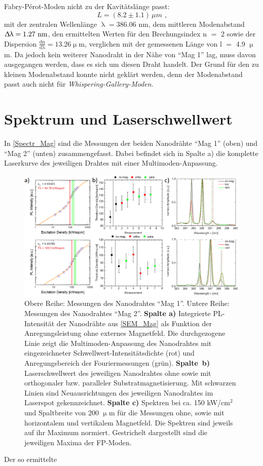 Fabry-Pérot-Moden nicht zu der Kavitätslänge passt: \begin{equation} L=(8.2 \pm
1.1)\, \mu m \text{ ,} \end{equation} mit der zentralen Wellenlänge $\uplambda =
\text{386.06 nm}$, dem mittleren Modenabstand $\Updelta \uplambda = \text{1.27
nm}$, den ermittelten Werten für den Brechungsindex n $=$ 2 sowie der Dispersion
$\frac{\text{dn}}{\text{d}\uplambda} = \text{13.26} \upmu\text{m}$, verglichen
mit der gemessenen Länge von l $=$ 4.9 $\upmu$m. Da jedoch kein weiterer
Nanodraht in der Nähe von ``Mag 1'' lag, muss davon ausgegangen werden, dass es
sich um diesen Draht handelt. Der Grund für den zu kleinen Modenabstand konnte
nicht geklärt werden, denn der Modenabstand passt auch nicht für
\textit{Whispering-Gallery-Moden}. \section{Spektrum und Laserschwellwert} In
\autoref{Spectr_Mag} sind die Messungen der beiden Nanodrähte ``Mag 1'' (oben)
und ``Mag 2'' (unten) zusammengefasst. Dabei befindet sich in Spalte a) die
komplette Laserkurve des jeweiligen Drahtes mit einer
Multimoden-Anpassung.\begin{figure}[b] \centering
\includegraphics[width=1\textwidth]{Bilder/Mag/Spectr_Mag} \caption{Obere Reihe:
Messungen des Nanodrahtes ``Mag 1''. Untere Reihe: Messungen des Nanodrahtes
``Mag 2''. \textbf{Spalte a)} Integrierte PL-Intensität der Nanodrähte aus
\autoref{SEM_Mag} als Funktion der Anregungsleistung ohne externes Magnetfeld.
Die durchgezogene Linie zeigt die Multimoden-Anpassung des Nanodrahtes mit
eingezeichneter Schwellwert-Intensitätsdichte (rot) und Anregungsbereich der
Fouriermessungen (grün). \mbox{\textbf{Spalte b)}} Laserschwellwert des
jeweiligen Nanodrahtes ohne sowie mit orthogonaler bzw. paralleler
Substratmagnetisierung. Mit schwarzen Linien sind Neuausrichtungen des
jeweiligen Nanodrahtes im Laserspot gekennzeichnet. \textbf{Spalte c)} Spektren
bei ca. 150 kW/cm$^\text{2}$ und Spaltbreite von 200 $\upmu$m für die Messungen
ohne, sowie mit horizontalem und vertikalem Magnetfeld. Die Spektren sind
jeweils auf ihr Maximum normiert. Gestrichelt dargestellt sind die jeweiligen
Maxima der FP-Moden.} \label{Spectr_Mag} \end{figure} Der so ermittelte
